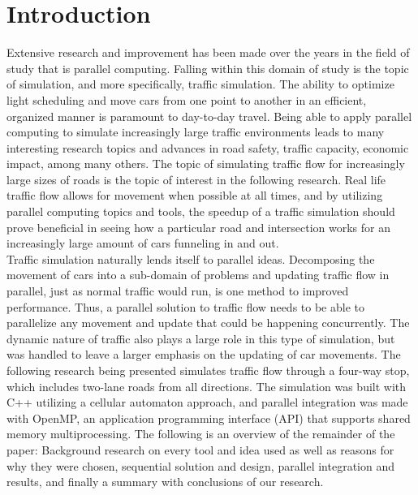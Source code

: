 \documentclass[conference]{IEEEtran}
\begin{document}
\section{Introduction}
Extensive research and improvement has been made over the years in the field of study that is parallel computing. Falling within this domain of study is the topic of simulation, and more specifically, traffic simulation. The ability to optimize light scheduling and move cars from one point to another in an efficient, organized manner is paramount to day-to-day travel. Being able to apply parallel computing to simulate increasingly large traffic environments leads to many interesting research topics and advances in road safety, traffic capacity, economic impact, among many others. The topic of simulating traffic flow for increasingly large sizes of roads is the topic of interest in the following research. Real life traffic flow allows for movement when possible at all times, and by utilizing parallel computing topics and tools, the speedup of a traffic simulation should prove beneficial in seeing how a particular road and intersection works for an increasingly large amount of cars funneling in and out.  \\
\hspace*{.2cm} Traffic simulation naturally lends itself to parallel ideas. Decomposing the movement of cars into a sub-domain of problems and updating traffic flow in parallel, just as normal traffic would run, is one method to improved performance. Thus, a parallel solution to traffic flow needs to be able to parallelize any movement and update that could be happening concurrently. The dynamic nature of traffic also plays a large role in this type of simulation, but was handled to leave a larger emphasis on the updating of car movements. The following research being presented simulates traffic flow through a four-way stop, which includes two-lane roads from all directions. The simulation was built with C++ utilizing a cellular automaton approach, and parallel integration was made with OpenMP, an application programming interface (API) that supports shared memory multiprocessing. The following is an overview of the remainder of the paper: Background research on every tool and idea used as well as reasons for why they were chosen, sequential solution and design, parallel integration and results, and finally a summary with conclusions of our research.
\end{document}
